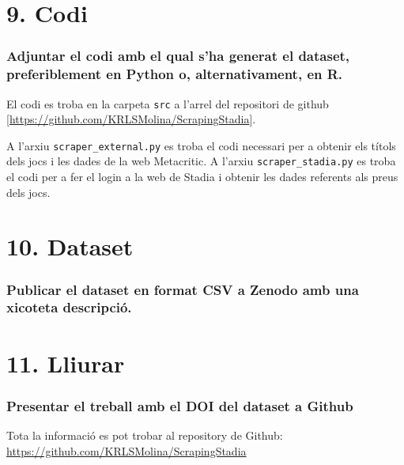 \documentclass[]{article}
\begin{document}
\hypertarget{codi}{%
\section{9. Codi}\label{codi}}

\hypertarget{adjuntar-el-codi-amb-el-qual-sha-generat-el-dataset-preferiblement-en-python-o-alternativament-en-r.}{%
\subsubsection{Adjuntar el codi amb el qual s'ha generat el dataset,
preferiblement en Python o, alternativament, en
R.}\label{adjuntar-el-codi-amb-el-qual-sha-generat-el-dataset-preferiblement-en-python-o-alternativament-en-r.}}

El codi es troba en la carpeta \texttt{src} a l'arrel del repositori de
github {[}\url{https://github.com/KRLSMolina/ScrapingStadia}{]}.

A l'arxiu \texttt{scraper\_external.py} es troba el codi necessari per a
obtenir els títols dels jocs i les dades de la web Metacritic. A l'arxiu
\texttt{scraper\_stadia.py} es troba el codi per a fer el login a la web
de Stadia i obtenir les dades referents als preus dels jocs.

\hypertarget{dataset}{%
\section{10. Dataset}\label{dataset}}

\hypertarget{publicar-el-dataset-en-format-csv-a-zenodo-amb-una-xicoteta-descripciuxf3.}{%
\subsubsection{Publicar el dataset en format CSV a Zenodo amb una
xicoteta
descripció.}\label{publicar-el-dataset-en-format-csv-a-zenodo-amb-una-xicoteta-descripciuxf3.}}

\hypertarget{lliurar}{%
\section{11. Lliurar}\label{lliurar}}

\hypertarget{presentar-el-treball-amb-el-doi-del-dataset-a-github}{%
\subsubsection{Presentar el treball amb el DOI del dataset a
Github}\label{presentar-el-treball-amb-el-doi-del-dataset-a-github}}

Tota la informació es pot trobar al repository de Github:
\url{https://github.com/KRLSMolina/ScrapingStadia}
\end{document}
